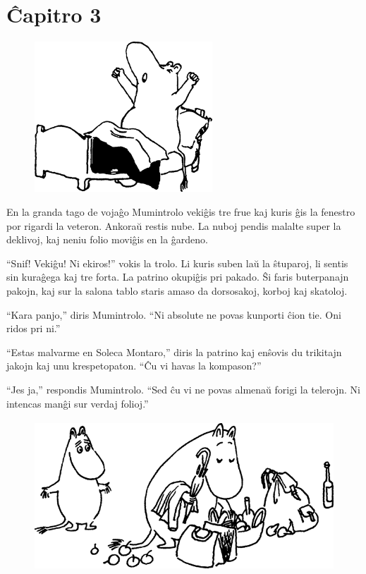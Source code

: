 \chapter*[Ĉapitro 3]{Ĉapitro 3}


\begin{figure}[htbp]
\centering
\includegraphics[width=189pt,height=160pt]{3-1.png}
\caption{}
\label{3-1}
\end{figure}

\noindent En la granda tago de vojaĝo Mumintrolo vekiĝis tre frue kaj kuris ĝis la fenestro por rigardi la veteron. Ankoraŭ restis nube. La nuboj pendis malalte super la deklivoj, kaj neniu folio moviĝis en la ĝardeno.

``Snif! Vekiĝu! Ni ekiros!'' vokis la trolo. Li kuris suben laŭ la ŝtuparoj, li sentis sin kuraĝega kaj tre forta. La patrino okupiĝis pri pakado. Ŝi faris buterpanajn pakojn, kaj sur la salona tablo staris amaso da dorsosakoj, korboj kaj skatoloj.

``Kara panjo,'' diris Mumintrolo. ``Ni absolute ne povas kunporti ĉion tie. Oni ridos pri ni.''

``Estas malvarme en Soleca Montaro,'' diris la patrino kaj enŝovis du trikitajn jakojn kaj unu krespetopaton. ``Ĉu vi havas la kompason?''

``Jes ja,'' respondis Mumintrolo. ``Sed ĉu vi ne povas almenaŭ forigi la telerojn. Ni intencas manĝi sur verdaj folioj.''

\begin{figure}[htbp]
\centering
\includegraphics[width=331pt,height=160pt]{3-2.png}
\caption{}
\label{3-2}
\end{figure}

